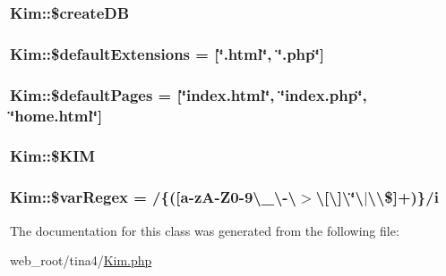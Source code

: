 \subsubsection[{\$create\+D\+B}]{\setlength{\rightskip}{0pt plus 5cm}Kim\+::\$create\+D\+B}\label{classKim_a68fb575a2ef7faf6b3b679280331033d}
\hypertarget{classKim_aecfd2bbe4c11ceb39810c393cd357b53}{}
\subsubsection[{\$default\+Extensions}]{\setlength{\rightskip}{0pt plus 5cm}Kim\+::\$default\+Extensions = \mbox{[}\char`\"{}.html\char`\"{}, \char`\"{}.php\char`\"{}\mbox{]}}\label{classKim_aecfd2bbe4c11ceb39810c393cd357b53}
\hypertarget{classKim_a761d5be4968e338c3d7ffa9f65ae3a40}{}
\subsubsection[{\$default\+Pages}]{\setlength{\rightskip}{0pt plus 5cm}Kim\+::\$default\+Pages = \mbox{[}\char`\"{}index.\+html\char`\"{}, \char`\"{}index.\+php\char`\"{}, \char`\"{}{\bf home.\+html}\char`\"{}\mbox{]}}\label{classKim_a761d5be4968e338c3d7ffa9f65ae3a40}
\hypertarget{classKim_a46554f1a34a5f3db1014d47b6ec37f00}{}
\subsubsection[{\$\+K\+I\+M}]{\setlength{\rightskip}{0pt plus 5cm}Kim\+::\$\+K\+I\+M}\label{classKim_a46554f1a34a5f3db1014d47b6ec37f00}
\hypertarget{classKim_ad641610f1c10b814588ea3ef78f04eb3}{}
\subsubsection[{\$var\+Regex}]{\setlength{\rightskip}{0pt plus 5cm}Kim\+::\$var\+Regex = \textquotesingle{}/\{(\mbox{[}{\bf a}-\/z\+A-\/Z0-\/9\textbackslash{}\+\_\+\textbackslash{}-\/\textbackslash{}$>$\textbackslash{}\mbox{[}\textbackslash{}\mbox{]}\textbackslash{}\char`\"{}\textbackslash{}$\vert$\textbackslash{}\textquotesingle{}\textbackslash{}\$\mbox{]}+)\}/i\textquotesingle{}}\label{classKim_ad641610f1c10b814588ea3ef78f04eb3}


The documentation for this class was generated from the following file\+:\begin{DoxyCompactItemize}
\item 
web\+\_\+root/tina4/\hyperlink{Kim_8php}{Kim.\+php}\end{DoxyCompactItemize}
